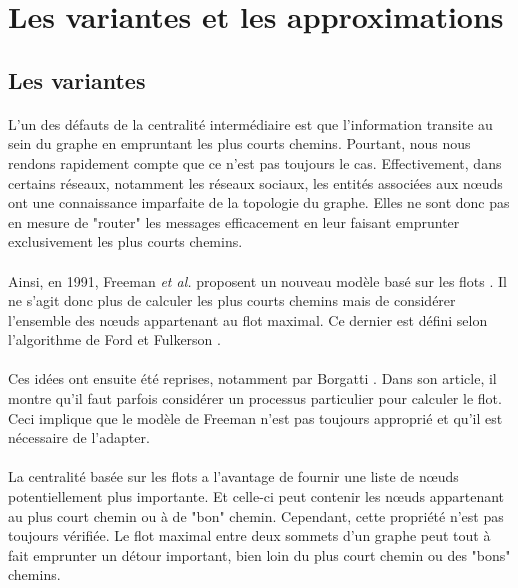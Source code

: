 \documentclass[a4paper, 10pt]{report}
\begin{document}
     \section{Les variantes et les approximations}

		\subsection{Les variantes}

\paragraph{}L'un des défauts de la centralité intermédiaire est que l'information transite au sein du graphe en empruntant les plus courts chemins. Pourtant, nous nous rendons rapidement compte que ce n'est pas toujours le cas. Effectivement, dans certains réseaux, notamment les réseaux sociaux, les entités associées aux n\oe uds ont une connaissance imparfaite de la topologie du graphe. Elles ne sont donc pas en mesure de "router" les messages efficacement en leur faisant emprunter exclusivement les plus courts chemins.

\paragraph{}Ainsi, en 1991, Freeman \textit{et al.} proposent un nouveau modèle basé sur les flots \cite{FreemanBorgattiWhite1991Centrality}. Il ne s'agit donc plus de calculer les plus courts chemins mais de considérer l'ensemble des n\oe uds appartenant au flot maximal. Ce dernier est défini selon l'algorithme de Ford et Fulkerson \cite{Ford1956Maximal}.

\paragraph{}Ces idées ont ensuite été reprises, notamment par Borgatti \cite{Borgatti2005Centrality}. Dans son article, il montre qu'il faut parfois considérer un processus particulier pour calculer le flot. Ceci implique que le modèle de Freeman n'est pas toujours approprié et qu'il est nécessaire de l'adapter.

\paragraph{}La centralité basée sur les flots a l'avantage de fournir une liste de n\oe uds potentiellement plus importante. Et celle-ci peut contenir les n\oe uds appartenant au plus court chemin ou à de "bon" chemin. Cependant, cette propriété n'est pas toujours vérifiée. Le flot maximal entre deux sommets d'un graphe peut tout à fait emprunter un détour important, bien loin du plus court chemin ou des "bons" chemins. 
\end{document}
